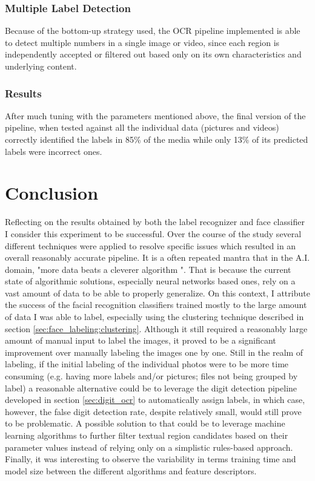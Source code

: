 \documentclass[11pt]{article}
\begin{document}
    \subsubsection{Multiple Label Detection}
        Because of the bottom-up strategy used, the OCR pipeline implemented is able to detect multiple numbers in a single image or video, since each region is independently accepted or filtered out based only on its own characteristics and underlying content.

    \subsubsection{Results}
        After much tuning with the parameters mentioned above, the final version of the pipeline, when tested against all the individual data (pictures and videos) correctly identified the labels in 85\% of the media while only 13\% of its predicted labels were incorrect ones.

\section{Conclusion}\label{sec:conclusion}
    Reflecting on the results obtained by both the label recognizer and face classifier I consider this experiment to be successful. Over the course of the study several different techniques were applied to resolve specific issues which resulted in an overall reasonably accurate pipeline. It is a often repeated mantra that in the A.I. domain, "more data beats a cleverer algorithm ". That is because the current state of algorithmic solutions, especially neural networks based ones, rely on a vast amount of data to be able to properly generalize. On this context, I attribute the success of the facial recognition classifiers trained mostly to the large amount of data I was able to label, especially using the clustering technique described in section \ref{sec:face_labeling:clustering}. Although it still required a reasonably large amount of manual input to label the images, it proved to be a significant improvement over manually labeling the images one by one. Still in the realm of labeling, if the initial labeling of the individual photos were to be more time consuming (e.g. having more labels and/or pictures; files not being grouped by label) a reasonable alternative could be to leverage the digit detection pipeline developed in section \ref{sec:digit_ocr} to automatically assign labels, in which case, however, the false digit detection rate, despite relatively small, would still prove to be problematic. A possible solution to that could be to leverage machine learning algorithms to further filter textual region candidates based on their parameter values instead of relying only on a simplistic rules-based approach. Finally, it was interesting to observe the variability in terms training time and model size between the different algorithms and feature descriptors.
\end{document}
